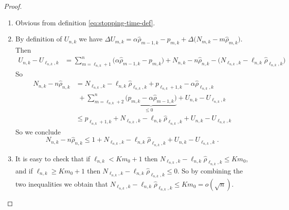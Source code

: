\documentclass[10pt,a4paper]{amsart}
\begin{document}
\begin{proof}
	\begin{enumerate}[label=(\roman*)]
		\item Obvious from definition \eqref{eq:stopping-time-def}.
		\item By definition of \(U_{n,k}\) we have \(\Delta U_{m,k} = \alpha \hat{\rho}_{m-1,k} - p_{m,k} 
		+ \Delta \Big( N_{m,k} - m \hat{\rho}_{m,k} \Big)\).
%						
		Then 
		\begin{align*}
			U_{n,k} - U_{\ell_{n,k},k}
			&= \sum_{m=\ell_{n,k}+1}^n \Big( \alpha \hat{\rho}_{m-1,k} - p_{m,k} \Big)
			+ N_{n,k} - n \hat{\rho}_{n,k}
			- \Big( N_{\ell_{n,k},k} - \ell_{n,k} \hat{\rho}_{\ell_{n,k},k} \Big)
		\end{align*}
		So 
		\begin{align*}
			N_{n,k} - n \hat{\rho}_{n,k}
			&= N_{\ell_{n,k},k} - \ell_{n,k} \hat{\rho}_{\ell_{n,k},k}
			+ p_{\ell_{n,k}+1,k} - \alpha \hat{\rho}_{\ell_{n,k},k} \\&\,\,+ \sum_{m=\ell_{n,k}+2}^n \underbrace{\Big( p_{m,k} - \alpha \hat{\rho}_{m-1,k} \Big)}_{\leq 0 \quad}
			+ U_{n,k} - U_{\ell_{n,k}, k}\\					
			&\leq p_{\ell_{n,k}+1,k} + N_{\ell_{n,k},k} - \ell_{n,k} \hat{\rho}_{\ell_{n,k},k}
			+ U_{n,k} - U_{\ell_{n,k}, k}
		\end{align*}
		So we conclude 	
		\[N_{n,k} - n\hat{\rho}_{n,k} \leq 1 + N_{\ell_{n,k},k} - \ell_{n,k} \hat{\rho}_{\ell_{n,k},k} + U_{n,k} - U_{\ell_{n,k},k}\;.\]
		
		\item It is easy to check that if $\ell_{n,k} < K m_0+1$ then \(N_{\ell_{n,k},k} - \ell_{n,k} \hat{\rho}_{\ell_{n,k},k} \leq K m_0\),
		and if \(\ell_{n,k} \geq Km_0 + 1\) then \(N_{\ell_{n,k},k} - \ell_{n,k} \hat{\rho}_{\ell_{n,k},k} \leq 0\).
		So by combining the two inequalities we obtain that \(N_{\ell_{n,k},k} - \ell_{n,k} \hat{\rho}_{\ell_{n,k},k} \leq K m_0 = o(\sqrt{n})\)\;.
	\end{enumerate}
\end{proof}
\end{document}
